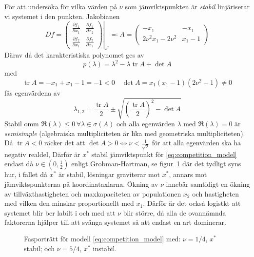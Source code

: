 \documentclass{article}
\DeclareMathOperator{\trace}{tr}
\newcommand\figurescale{1}
\begin{document}
För att undersöka för vilka värden på $\nu$ som jämviktspunkten är \emph{stabil}
linjäriserar vi systemet i den punkten.
Jakobianen
$$ \left. Df = \begin{pmatrix}
	\frac{\partial f_1}{\partial x_1} & \frac{\partial f_1}{\partial x_2} \\
	\frac{\partial f_2}{\partial x_1} & \frac{\partial f_2}{\partial x_2}
\end{pmatrix} \right\lvert_{x^*} \eqqcolon A = \begin{pmatrix}
	-x_1 & -x_1 \\
	2\nu^2x_1 - 2\nu^2 & x_1 - 1
\end{pmatrix} $$
Därav då det karakteristiska polynomet ges av
$$ p(\lambda) = \lambda^2 - \lambda \trace A + \det A $$
med
$$ \trace A = -x_1 + x_1 - 1 = -1 < 0 \quad \det A = x_1 (x_1 - 1) (2\nu^2 - 1) \ne 0 $$
fås egenvärdena av
$$ \lambda_{1,2} = \frac{\trace A}2 \pm \sqrt{\left(\frac{\trace A}2\right)^2 - \det A} $$
Stabil omm $\Re(\lambda) \le 0 \, \forall \lambda \in \sigma(A)$
och alla egenvärden $\lambda$ med $\Re(\lambda) = 0$ är \emph{semisimple}
(algebraiska multipliciteten är lika med geometriska multipliciteten).
Då $\trace A < 0$ räcker det att $\det A > 0 \Leftrightarrow \nu < \frac1{\sqrt2}$
för att alla egenvärden ska ha negativ realdel,
Därför är $x^*$ stabil jämviktspunkt för \eqref{eq:competition_model}
endast då $\nu \in (0, \frac12)$ enligt Grobman-Hartman,
se figur~\ref{fig:phase_portrait1} där det tydligt syns
hur, i fallet då $x^*$ är stabil, lösningar graviterar mot $x^*$,
annars mot jämviktspunkterna på koordinataxlarna.
Ökning av $\nu$ innebär samtidigt en ökning av tillväxthastigheten
och maxkapaciteten av populationen $x_2$ och hastigheten
med vilken den minskar proportionellt med $x_1$.
Därför är det också logistkt att systemet blir ber labilt
i och med att $\nu$ blir större,
då alla de ovannämnda faktorerna hjälper till att svänga systemet
så att endast en art dominerar.

\begin{figure}
	\centering
	\renewcommand{\figurescale}{0.2}
	\subfloat[]{ \label{fig:mod1_stable}}
	\subfloat[]{ \label{fig:mod1_unstable}}
	\caption{Fasporträtt för modell \eqref{eq:competition_model} med:
	\protect{} $\nu=1/4$, $x^*$ stabil; och
	\protect{} $\nu=5/4$, $x^*$ instabil. \label{fig:phase_portrait1}}
\end{figure}
\end{document}
